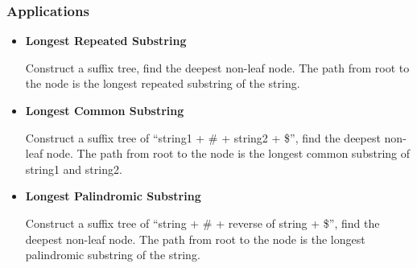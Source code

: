 \documentclass[catalog.tex]{subfiles}
\begin{document}
	\subsubsection*{Applications}
	\begin{itemize}
		\item {\bf Longest Repeated Substring\cite{visualgo.net}}\par
		Construct a suffix tree, find the deepest non-leaf node. The path from root to the node is the longest repeated substring of the string.
		\item {\bf Longest Common Substring\cite{visualgo.net}}\par
		Construct a suffix tree of ``string1 + \# + string2 + \$'', find the deepest non-leaf node. The path from root to the node is the longest common substring of string1 and string2.
		\item {\bf Longest Palindromic Substring\cite{GeeksforGeeks}}\par
		Construct a suffix tree of ``string + \# + reverse of string + \$'', find the deepest non-leaf node. The path from root to the node is the longest palindromic substring of the string.
	\end{itemize}


\singlespacing
\printbibliography[title={References.},resetnumbers=true,heading=subbibliography]
\end{document}
